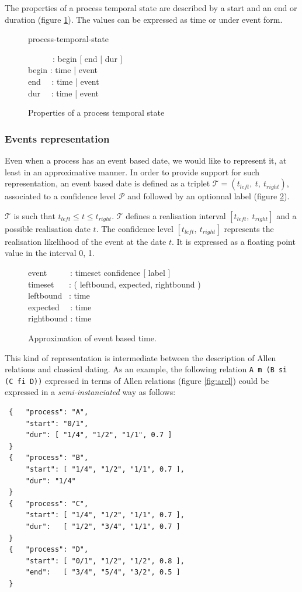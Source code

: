 \documentclass{article}
\newcommand{\defs}	[1]		{ 	\begin{center}\colorbox{mygrey}{
								\begin{minipage}[t]{0.99\columnwidth} 
								\ttfamily \small #1 
								\end{minipage}}\end{center}}
\newcommand{\verbcaption}[1]	{ \vspace{-5mm} \caption{#1}}
\begin{document}
The properties of a process temporal state are described by a start and an end or duration (figure \ref{fig:time}). The values can be expressed as time or under event form. 
\begin{figure}[h]
\defs{
process-temporal-state 

\ \ \ \ \ \ : begin  [ end | dur ] \\
begin : time | event \\
end \ \ : time | event \\
dur \ \ : time | event 
}
\verbcaption{Properties of a process temporal state}
\label{fig:time}
\end{figure}



\subsubsection{Events representation}

Even when a process has an event based date, we would like to represent it, at least in an approximative manner. In order to provide support for such representation, an event based date is defined as a triplet $\mathcal{T} = ( t_{left},\ t,\ t_{right} )$, associated to a confidence level  $\mathcal{P}$  and followed by an optionnal label  (figure \ref{fig:evtime}). 

$\mathcal{T}$ is such that $t_{left} \leqslant t \leqslant t_{right}$. $\mathcal{T}$ defines a realisation interval $[t_{left},\ t_{right}]$ and a possible realisation date $t$. The confidence level  $[t_{left},\ t_{right}]$ represents the realisation likelihood of the event at the date $t$. It is expressed as a floating point value in the interval 0, 1.

\begin{figure}[h]
\defs{
event \ \ \ \ \ :  timeset confidence [ label ] \\
timeset \ \ \ :  ( leftbound, expected, rightbound ) \\
leftbound \ : time \\
expected \ \ : time \\
rightbound : time 
}
\verbcaption{Approximation of event based time.}
\label{fig:evtime}
\end{figure}

This kind of representation is intermediate between the description of Allen relations and classical dating. As an example, the following relation {\small \texttt{A m (B si (C fi D))}} expressed in terms of Allen relations (figure \ref{fig:arel}) could be expressed in a \emph{semi-instanciated} way as follows:
{\small \begin{verbatim}
 {   "process": "A",
     "start": "0/1",
     "dur": [ "1/4", "1/2", "1/1", 0.7 ]
 }
 {   "process": "B",
     "start": [ "1/4", "1/2", "1/1", 0.7 ],
     "dur": "1/4"
 }
 {   "process": "C",
     "start": [ "1/4", "1/2", "1/1", 0.7 ],
     "dur":   [ "1/2", "3/4", "1/1", 0.7 ]
 }
 {   "process": "D",
     "start": [ "0/1", "1/2", "1/2", 0.8 ],
     "end":   [ "3/4", "5/4", "3/2", 0.5 ]
 }
\end{verbatim}
}
\end{document}
